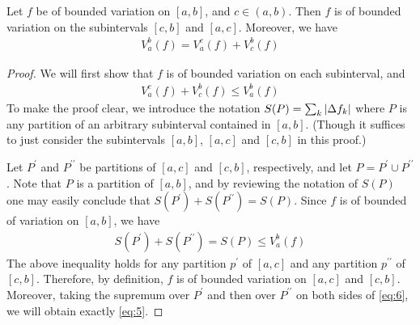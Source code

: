 \documentclass[thmcnt=section, color=blue, 12pt]{my-elegantbook}
\begin{document}
\begin{theorem} \label{thm:2}
	Let $f$ be of bounded variation on $[a, b]$, and $c \in (a, b)$.
	Then $f$ is of bounded variation on the subintervals $[c, b]$ and $[a, c]$.
	Moreover, we have
	\begin{align}
		V_a^b(f) = V_a^c(f) + V_c^b(f)
		\label{eq:9}
	\end{align}
\end{theorem}

\begin{proof}
	We will first show that $f$ is of bounded variation on each subinterval, and
	\begin{align}
		V_a^c(f) + V_c^b(f) \leq V_a^b(f)
		\label{eq:5}
	\end{align}
	To make the proof clear,
	we introduce the notation $S(P) = \sum_k \left\lvert \Delta f_k \right\rvert$
	where $P$ is any partition of an arbitrary subinterval contained in $[a, b]$.
	(Though it suffices to just consider the subintervals $[a, b]$, $[a, c]$
	and $[c, b]$ in this proof.)

	Let $P^\prime$ and $P^{\prime\prime}$ be partitions of $[a, c]$ and $[c, b]$,
	respectively,
	and let $P = P^\prime \cup P^{\prime\prime}$.
	Note that $P$ is a partition of $[a, b]$,
	and by reviewing the notation of $S(P)$
	one may easily conclude that $S(P^\prime) + S(P^{\prime\prime}) = S(P)$.
	Since $f$ is of bounded of variation on $[a, b]$, we have
	\begin{align}
		S(P^\prime) + S(P^{\prime\prime}) = S(P) \leq V_a^b (f)
		\label{eq:6}
	\end{align}
	The above inequality holds for any partition $p^\prime$ of $[a, c]$
	and any partition $p^{\prime\prime}$ of $[c, b]$.
	Therefore, by definition, $f$ is of bounded variation on $[a, c]$ and $[c, b]$.
	Moreover, taking the supremum over $P^\prime$ and then over $P^{\prime\prime}$
	on both sides of \eqref{eq:6}, we will obtain exactly \eqref{eq:5}.


\end{proof}
\end{document}
